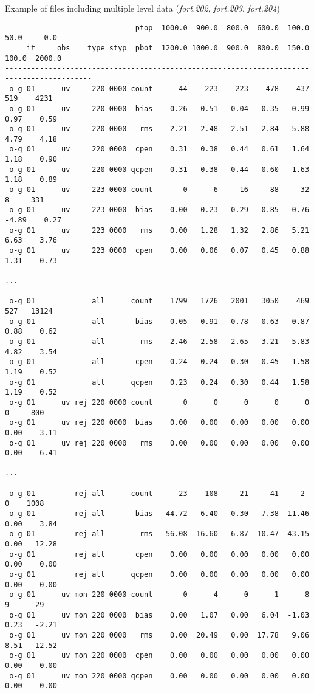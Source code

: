 Example of files including multiple level data (\textit{fort.202}, \textit{fort.203}, \textit{fort.204})

\begin{scriptsize}
\begin{verbatim}
                              ptop  1000.0  900.0  800.0  600.0  100.0   50.0     0.0
     it     obs    type styp  pbot  1200.0 1000.0  900.0  800.0  150.0  100.0  2000.0
------------------------------------------------------------------------------------------
 o-g 01      uv     220 0000 count      44    223    223    478    437    519    4231
 o-g 01      uv     220 0000  bias    0.26   0.51   0.04   0.35   0.99   0.97    0.59
 o-g 01      uv     220 0000   rms    2.21   2.48   2.51   2.84   5.88   4.79    4.18
 o-g 01      uv     220 0000  cpen    0.31   0.38   0.44   0.61   1.64   1.18    0.90
 o-g 01      uv     220 0000 qcpen    0.31   0.38   0.44   0.60   1.63   1.18    0.89
 o-g 01      uv     223 0000 count       0      6     16     88     32      8     331
 o-g 01      uv     223 0000  bias    0.00   0.23  -0.29   0.85  -0.76  -4.89    0.27
 o-g 01      uv     223 0000   rms    0.00   1.28   1.32   2.86   5.21   6.63    3.76
 o-g 01      uv     223 0000  cpen    0.00   0.06   0.07   0.45   0.88   1.31    0.73

...
 
 o-g 01             all      count    1799   1726   2001   3050    469    527   13124
 o-g 01             all       bias    0.05   0.91   0.78   0.63   0.87   0.88    0.62
 o-g 01             all        rms    2.46   2.58   2.65   3.21   5.83   4.82    3.54
 o-g 01             all       cpen    0.24   0.24   0.30   0.45   1.58   1.19    0.52
 o-g 01             all      qcpen    0.23   0.24   0.30   0.44   1.58   1.19    0.52
 o-g 01      uv rej 220 0000 count       0      0      0      0      0      0     800
 o-g 01      uv rej 220 0000  bias    0.00   0.00   0.00   0.00   0.00   0.00    3.11
 o-g 01      uv rej 220 0000   rms    0.00   0.00   0.00   0.00   0.00   0.00    6.41

...

 o-g 01         rej all      count      23    108     21     41     2      0    1008
 o-g 01         rej all       bias   44.72   6.40  -0.30  -7.38  11.46   0.00    3.84
 o-g 01         rej all        rms   56.08  16.60   6.87  10.47  43.15   0.00   12.28
 o-g 01         rej all       cpen    0.00   0.00   0.00   0.00   0.00   0.00    0.00
 o-g 01         rej all      qcpen    0.00   0.00   0.00   0.00   0.00   0.00    0.00
 o-g 01      uv mon 220 0000 count       0      4      0      1      8      9      29
 o-g 01      uv mon 220 0000  bias    0.00   1.07   0.00   6.04  -1.03   0.23   -2.21
 o-g 01      uv mon 220 0000   rms    0.00  20.49   0.00  17.78   9.06   8.51   12.52
 o-g 01      uv mon 220 0000  cpen    0.00   0.00   0.00   0.00   0.00   0.00    0.00
 o-g 01      uv mon 220 0000 qcpen    0.00   0.00   0.00   0.00   0.00   0.00    0.00


\end{verbatim}
\end{scriptsize}
